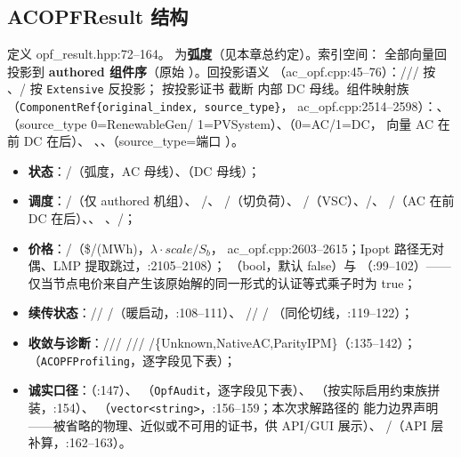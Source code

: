 \subsection{ACOPFResult 结构}
定义 opf\_result.hpp:72--164。 为\textbf{弧度}（见本章总约定）。索引空间：
全部向量回投影到 \textbf{authored 组件序}（原始 ）。回投影语义
（ac\_opf.cpp:45--76）：///
 按 、/ 按
\texttt{Extensive} 反投影； 按投影证书  截断
内部 DC 母线。组件映射族（\texttt{ComponentRef\{original\_index, source\_type\}}，
ac\_opf.cpp:2514--2598）：、（source\_type 0=RenewableGen/
1=PVSystem）、（0=AC/1=DC， 向量 AC 在前 DC 在后）、
、、（source\_type=端口 ）。
\begin{itemize}
  \item \textbf{状态}：/（弧度，AC 母线）、（DC 母线）；
  \item \textbf{调度}：/（仅 authored 机组）、
        /、
        /（切负荷）、
        /（VSC）、/、
        /（AC 在前 DC 在后）、、
        、/；
  \item \textbf{价格}：/（\$/(MWh)，$\lambda\cdot scale/S_b$，
        ac\_opf.cpp:2603--2615；Ipopt 路径无对偶、LMP 提取跳过，:2105--2108）；
        （bool，默认 false）与 （:99--102）——
        仅当节点电价来自产生该原始解的同一形式的认证等式乘子时为 true；
  \item \textbf{续传状态}：//
        /（暖启动，:108--111）、
        //
        /
        （同伦切线，:119--122）；
  \item \textbf{收敛与诊断}：///
        ///
        /\{Unknown,NativeAC,ParityIPM\}（:135--142）；
        （\texttt{ACOPFProfiling}，逐字段见下表）；
  \item \textbf{诚实口径}：（:147）、
        （\texttt{OpfAudit}，逐字段见下表）、
        （按实际启用约束族拼装，:154）、
        （\texttt{vector<string>}，:156--159；本次求解路径的
        能力边界声明——被省略的物理、近似或不可用的证书，供 API/GUI 展示）、
        /（API 层补算，:162--163）。
\end{itemize}

